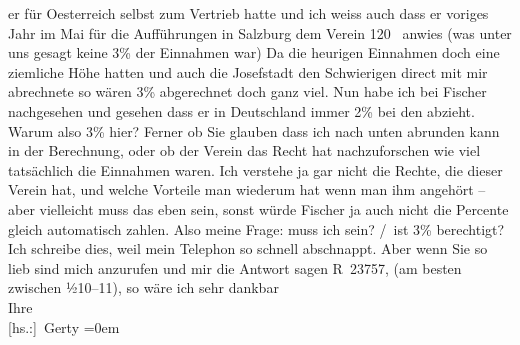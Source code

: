 \begin{ledgroupsized}[t]{13cm}
               er für Oesterreich selbst zum Vertrieb hatte
               und ich weiss auch dass er voriges Jahr im Mai für die Aufführungen in
                  Salzburg dem Verein 120 \label{K_L02525-1v}\label{K_L02525-1h} anwies (was unter uns gesagt keine 3{\%} der Einnahmen war) Da die heurigen Einnahmen doch eine
               ziemliche Höhe hatten und auch die Josefstadt den
                  Schwierigen direct mit mir abrechnete so
               wären 3{\%}{ } abgerechnet doch ganz viel.\pend
           \pstart
           Nun habe ich bei Fischer nachgesehen und gesehen
               dass er in Deutschland immer 2{\%} bei den \label{T_L02525-1v}\label{T_L02525-1h} abzieht. Warum also 3{\%} hier? Ferner ob Sie glauben dass ich nach unten abrunden
               kann in der Berechnung, oder ob der Verein das Recht hat nachzuforschen wie viel tatsächlich die Einnahmen
               waren. Ich verstehe ja gar nicht die Rechte, die dieser Verein hat, und welche Vorteile man
               wiederum hat wenn man ihm angehört – aber vielleicht muss das eben sein, sonst würde
               Fischer ja auch nicht die Percente gleich automatisch zahlen.\pend
           \pstart
           Also meine Frage: muss ich  sein?\pend
           / ist 3{\%} berechtigt?\pend
           \pstart
           Ich schreibe dies, weil mein Telephon so schnell abschnappt. Aber wenn Sie so lieb
               sind mich anzurufen und mir die Antwort sagen R 23757, (am besten zwischen
                  ½10–11), so wäre ich sehr dankbar\pend
           \pstart
           \label{T_L02525-2v}\label{T_L02525-2h}{\\[\baselineskip]}Ihre{\\[\baselineskip]}\spacefill\mbox{{[}hs.:{]} Gerty}\pend
           \leftskip=0em{}
         
         \endnumbering{}\end{ledgroupsized}  \newcommand{\dateiname}{L02525}\newcommand{\titel}{Gerty von Hofmannsthal an Arthur Schnitzler, 23. 11. 1929}\newcommand{\editorInnen}{Martin Anton Müller und Gerd-Hermann Susen}
      